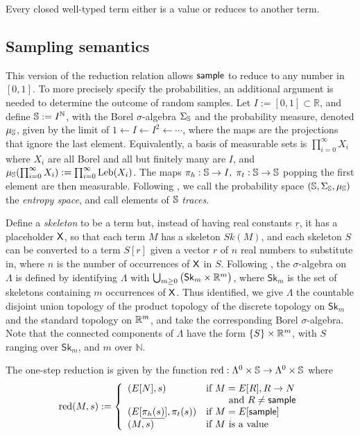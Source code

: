 Every closed well-typed term either is a value or reduces to another term.

\subsection{Sampling semantics}
\label{sec:sampling semantics}
This version of the reduction relation allows $\mathsf{sample}$ to reduce to any number in $[0,1]$. 
To more precisely specify the probabilities, an additional argument is needed to determine the outcome of random samples. Let $ I := [0,1] \subset \mathbb{R} $, and define ${\mathbb{S}} := I^{\mathbb{N}}$, with the Borel $\sigma$-algebra $\Sigma_{\mathbb{S}}$ and the probability measure, denoted $\mu_{{\mathbb{S}}}$, given by the limit of $1 \gets I \gets I^2 \gets \cdots$, where the maps are the projections that ignore the last element. Equivalently, a basis of measurable sets is $\prod_{i=0}^\infty X_i$ where $X_i$ are all Borel and all but finitely many are $I$, and $\mu_{{\mathbb{S}}} (\prod_{i=0}^\infty X_i) := \prod_{i=0}^\infty \mathrm{Leb}(X_i)$.
The maps $\pi_h:{\mathbb{S}} \to I, \; \pi_t:{\mathbb{S}} \to {\mathbb{S}}$ popping the first element are then measurable.
Following \cite{DBLP:conf/esop/CulpepperC17}, we call the probability space $({\mathbb{S}}, \Sigma_{\mathbb{S}}, \mu_{{\mathbb{S}}})$ the \emph{entropy space}, and call elements of ${\mathbb{S}}$ \emph{traces}.

Define a \emph{skeleton} to be a term but, instead of having real constants $\underline r$, it has a placeholder $\mathsf{X}$, so that each term $M$ has a skeleton $\mathit{Sk}(M)$, and each skeleton $S$ can be converted to a term $S[r]$ given a vector $r$ of $n$ real numbers to substitute in, where $n$ is the number of occurrences of $\mathsf{X}$ in $S$. 
Following \cite{DBLP:conf/icfp/BorgstromLGS16}, the $\sigma$-algebra on $\Lambda$ is defined by identifying $\Lambda$ with $\bigcup_{m\geq 0} \big(\mathsf{Sk}_m \times \mathbb{R}^m \big)$, where $\mathsf{Sk}_m$ is the set of skeletons containing $m$ occurrences of $\mathsf{X}$.
Thus identified, we give $\Lambda$ the countable disjoint union topology of the product topology of the discrete topology on $\mathsf{Sk}_m$ and the standard topology on $\mathbb{R}^m$, and take the corresponding Borel $\sigma$-algebra.
Note that the connected components of $\Lambda$ have the form $\{S\} \times \mathbb{R}^m$, with $S$ ranging over $\mathsf{Sk}_m$, and $m$ over $\mathbb{N}$.

The one-step reduction is given by the function $\operatorname{red} : \Lambda^0 \times {\mathbb{S}} \to \Lambda^0 \times {\mathbb{S}}$ where
\begin{equation*}
\operatorname{red}(M,s) := \left\{
    \begin{array}{ll}
        (E[N],s) & \text{if } M = E[R], R \to N\\
        & \qquad \text{ and } R \neq \mathsf{sample} \\
        (E[\underline{\pi_h(s)}],\pi_t(s)) & \text{if } M = E[\mathsf{sample}] \\
        (M,s) & \text{if } M \text{ is a value}
    \end{array} \right .
\end{equation*}

